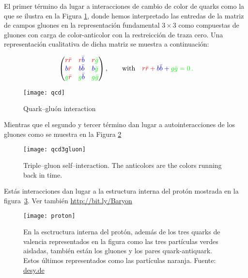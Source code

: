 El primer término da lugar a interacciones de cambio de color de quarks como la que se ilustra en la Figura \ref{fig:qcd}, donde hemos interpretado las entredas de la matriz de campos gluones en la representación fundamental $3\times3$ como compuestas de gluones con carga de color-anticolor con la restreicción de traza cero. Una representación cualitativa de dicha matriz se muestra a continuación:
\begin{frame}  
    \begin{align}
\label{eq:glu}
      \begin{pmatrix}
        \color{red}{r\bar{r}} & \color{red}{r}\color{blue}\bar{b} &\color{red}{r}\color{green}\bar{g}\\ 
        \color{blue}{b}\color{red}{\bar{r}} & \color{blue}{b\bar{b}} &\color{blue}{b}\color{green}{\bar{g}}\\ 
        \color{green}{g}\color{red}{\bar{r}} & \color{green}g\color{blue}{\bar{b}} &\color{green}{g\bar{g}}\\ 
      \end{pmatrix},\qquad\text{with}\quad 
      \color{red}{r\bar{r}}+\color{blue}{b\bar{b}}+\color{green}{g\bar{g}}=0\,.
    \end{align}

\begin{figure}
  \centering
  \texttt{[image: qcd]} %
  \caption{Quark--gluón interaction}
  \label{fig:qcd}
\end{figure}
\end{frame}
Mientras que el segundo y tercer término dan lugar a autointeracciones de los gluones como se muestra en la Figura \ref{fig:qcd3gluon}
\begin{frame}
\begin{figure}
  \centering
  \texttt{[image: qcd3gluon]}%
  \caption{Triple--gluon self--interaction. The anticolors are the colors running back in time.}
  \label{fig:qcd3gluon}
\end{figure}
\end{frame}

Estás interacciones dan lugar a la estructura interna del protón mostrada en la figura~\ref{fig:prt}. Ver también \url{http://bit.ly/Baryon}

\begin{frame}
  \begin{figure}
    \centering
  \texttt{[image: proton]}    
    \caption{En la esctructura interna del protón, además de los tres quarks de valencia representados en la figura como las tres partículas verdes aisladas, también están los gluones y los pares quark-antiquark. Estos últimos representados como las partículas naranja. Fuente: \href{http://www.desy.de/news/news_search/index_eng.html?openDirectAnchor=829}{desy.de}}
    \label{fig:prt}
  \end{figure}

\end{frame}

